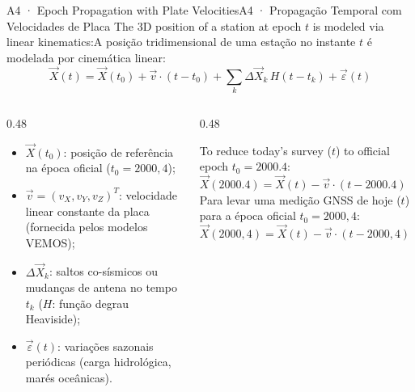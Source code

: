\documentclass[aspectratio=169,11pt]{beamer}
\newcommand{\tr}[2]{\ifEN#2\else#1\fi}
\begin{document}
\begin{frame}{\tr{A4 · Propagação Temporal com Velocidades de Placa}{A4 · Epoch Propagation with Plate Velocities}}
  \scriptsize
  \tr{A posição tridimensional de uma estação no instante $t$ é modelada por cinemática linear:}{The
  3D position of a station at epoch $t$ is modeled via linear kinematics:}
  \begin{equation*}
    \vec{X}(t) = \vec{X}(t_0) + \vec{v} \cdot (t - t_0) + \sum_{k} \Delta \vec{X}_k \, H(t - t_k) + \vec{\varepsilon}(t)
  \end{equation*}
  \begin{columns}[onlytextwidth]
    \begin{column}{0.48\textwidth}
      \begin{itemize}
        \tiny
        \item $\vec{X}(t_0)$: posição de referência na época oficial ($t_0 = 2000{,}4$);
        \item $\vec{v} = (v_X, v_Y, v_Z)^T$: velocidade linear constante da placa (fornecida pelos modelos VEMOS);
        \item $\Delta \vec{X}_k$: saltos co-sísmicos ou mudanças de antena no tempo $t_k$ ($H$: função degrau Heaviside);
        \item $\vec{\varepsilon}(t)$: variações sazonais periódicas (carga hidrológica, marés oceânicas).
      \end{itemize}
    \end{column}
    \begin{column}{0.48\textwidth}
      \begin{tcolorbox}[colback=mIndigo!8, colframe=mIndigo, title={\tr{Para o usuário prático}{For practical users}}]
        \scriptsize \tr{Para levar uma medição GNSS de hoje ($t$) para a época oficial $t_0 = 2000{,}4$:\\[3pt]
        \centering
        $\vec{X}(2000{,}4) = \vec{X}(t) - \vec{v} \cdot (t - 2000{,}4)$}{To reduce today's survey ($t$)
        to official epoch $t_0 = 2000.4$:\\[3pt]
        \centering
        $\vec{X}(2000.4) = \vec{X}(t) - \vec{v} \cdot (t - 2000.4)$}
      \end{tcolorbox}
    \end{column}
  \end{columns}
\end{frame}
\end{document}
